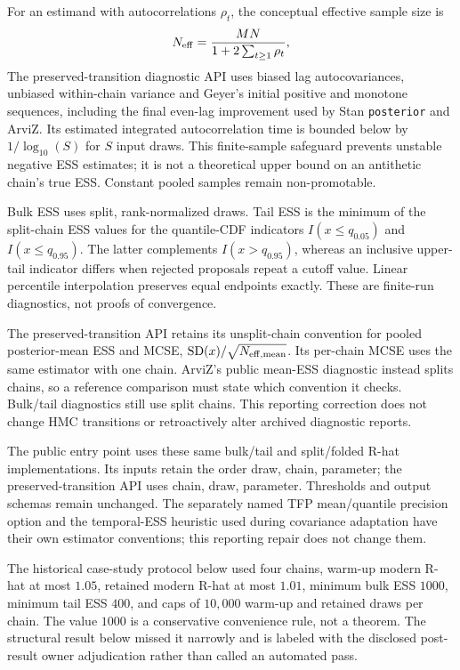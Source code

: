 For an estimand with autocorrelations $\rho_t$, the conceptual effective sample
size is
\begin{equation}
 N_{\rm eff}=\frac{MN}{1+2\sum_{t\ge1}\rho_t},
\end{equation}
The preserved-transition diagnostic API uses biased lag autocovariances,
unbiased within-chain variance and Geyer's initial positive and monotone
sequences, including the final even-lag improvement used by Stan
\texttt{posterior} and ArviZ.  Its estimated integrated autocorrelation time
is bounded below by $1/\log_{10}(S)$ for $S$ input draws.  This finite-sample
safeguard prevents unstable negative ESS estimates; it is not a theoretical
upper bound on an antithetic chain's true ESS.  Constant pooled samples remain
non-promotable.

Bulk ESS uses split, rank-normalized draws.  Tail ESS is the minimum of the
split-chain ESS values for the quantile-CDF indicators $I(x\le q_{0.05})$ and
$I(x\le q_{0.95})$.  The latter complements $I(x>q_{0.95})$, whereas an
inclusive upper-tail indicator differs when rejected proposals repeat a
cutoff value.  Linear percentile interpolation preserves equal endpoints
exactly.  These are finite-run diagnostics, not proofs of convergence.

The preserved-transition API retains its unsplit-chain convention for pooled
posterior-mean ESS and MCSE, $\operatorname{SD}(x)/\sqrt{N_{\rm eff,mean}}$.
Its per-chain MCSE uses the same estimator with one chain.  ArviZ's public
mean-ESS diagnostic instead splits chains, so a reference comparison must
state which convention it checks.  Bulk/tail diagnostics still use split
chains.  This reporting correction does not change HMC transitions or
retroactively alter archived diagnostic reports.

The public  entry point uses these same
bulk/tail and split/folded R-hat implementations. Its inputs retain the order
draw, chain, parameter; the preserved-transition API uses chain, draw,
parameter. Thresholds and output schemas remain unchanged. The separately named
TFP mean/quantile precision option and the temporal-ESS heuristic used during
covariance adaptation have their own estimator conventions; this reporting
repair does not change them.

The historical case-study protocol below used four chains, warm-up modern R-hat at most
$1.05$, retained modern R-hat at most $1.01$, minimum bulk ESS $1000$, minimum
tail ESS $400$, and caps of $10{,}000$ warm-up and retained draws per chain.
The value $1000$ is a conservative convenience rule, not a theorem.  The
structural result below missed it narrowly and is labeled with the disclosed
post-result owner adjudication rather than called an automated pass.


